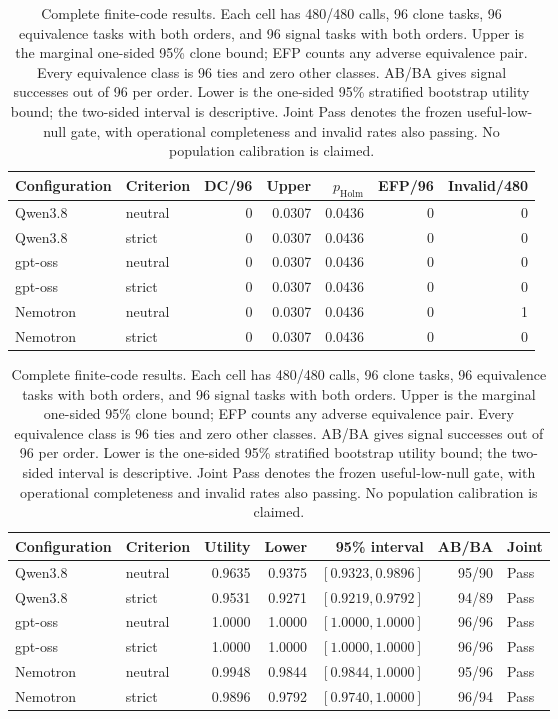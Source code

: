 \begin{table}[t]
\centering\small
\setlength{\tabcolsep}{4pt}
\begin{tabular}{llrrrrr}
\toprule
Configuration & Criterion & DC/96 & Upper & $p_{\mathrm{Holm}}$ & EFP/96 & Invalid/480 \\
\midrule
Qwen3.8 & neutral & 0 & 0.0307 & 0.0436 & 0 & 0 \\
Qwen3.8 & strict & 0 & 0.0307 & 0.0436 & 0 & 0 \\
gpt-oss & neutral & 0 & 0.0307 & 0.0436 & 0 & 0 \\
gpt-oss & strict & 0 & 0.0307 & 0.0436 & 0 & 0 \\
Nemotron & neutral & 0 & 0.0307 & 0.0436 & 0 & 1 \\
Nemotron & strict & 0 & 0.0307 & 0.0436 & 0 & 0 \\
\bottomrule
\end{tabular}
\medskip
\begin{tabular}{llrrrrl}
\toprule
Configuration & Criterion & Utility & Lower & 95\% interval & AB/BA & Joint \\
\midrule
Qwen3.8 & neutral & 0.9635 & 0.9375 & $[0.9323,0.9896]$ & 95/90 & Pass \\
Qwen3.8 & strict & 0.9531 & 0.9271 & $[0.9219,0.9792]$ & 94/89 & Pass \\
gpt-oss & neutral & 1.0000 & 1.0000 & $[1.0000,1.0000]$ & 96/96 & Pass \\
gpt-oss & strict & 1.0000 & 1.0000 & $[1.0000,1.0000]$ & 96/96 & Pass \\
Nemotron & neutral & 0.9948 & 0.9844 & $[0.9844,1.0000]$ & 95/96 & Pass \\
Nemotron & strict & 0.9896 & 0.9792 & $[0.9740,1.0000]$ & 96/94 & Pass \\
\bottomrule
\end{tabular}
\caption{Complete finite-code results. Each cell has 480/480 calls, 96 clone tasks, 96 equivalence tasks with both orders, and 96 signal tasks with both orders. Upper is the marginal one-sided 95\% clone bound; EFP counts any adverse equivalence pair. Every equivalence class is 96 ties and zero other classes. AB/BA gives signal successes out of 96 per order. Lower is the one-sided 95\% stratified bootstrap utility bound; the two-sided interval is descriptive. Joint Pass denotes the frozen useful-low-null gate, with operational completeness and invalid rates also passing. No population calibration is claimed.}
\label{tab:v6-results}
\end{table}
